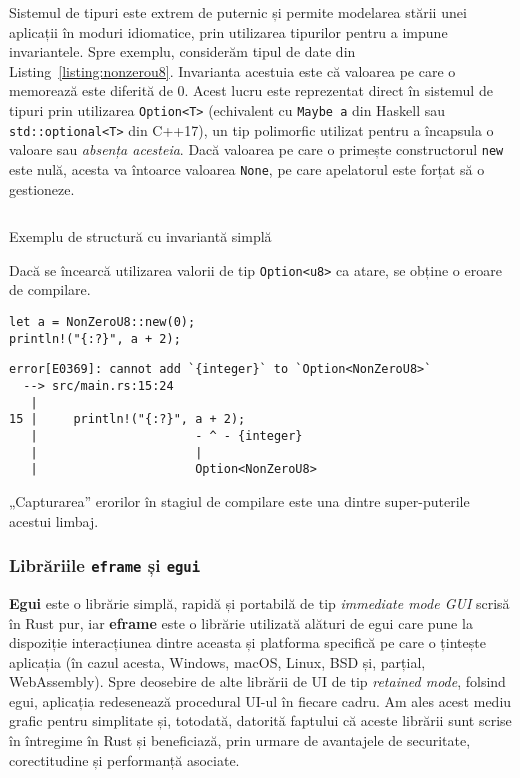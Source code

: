 \documentclass[a4paper]{article}
\begin{document}
Sistemul de tipuri este extrem de puternic și permite modelarea stării unei aplicații în moduri idiomatice, prin utilizarea tipurilor
pentru a impune invariantele. Spre exemplu, considerăm tipul de date din Listing~\ref{listing:nonzerou8}. Invarianta acestuia este
că valoarea pe care o memorează este diferită de $0$. Acest lucru este reprezentat direct în sistemul de tipuri prin utilizarea
\texttt{Option<T>} (echivalent cu \texttt{Maybe a} din Haskell sau \texttt{std::optional<T>} din C++17), un tip polimorfic utilizat
pentru a încapsula o valoare sau \textit{absența acesteia}. Dacă valoarea pe care o primește constructorul \texttt{new} este nulă,
acesta va întoarce valoarea \texttt{None}, pe care apelatorul este forțat să o gestioneze.

\begin{listing}
	\inputminted{rust}{codeblocks/nonzerou8.rs}
	\caption{Exemplu de structură cu invariantă simplă}
	\label{listing:nonzerou8}
\end{listing}

Dacă se încearcă utilizarea valorii de tip \texttt{Option<u8>} ca atare, se obține o eroare de compilare.

\begin{verbatim}
let a = NonZeroU8::new(0);
println!("{:?}", a + 2);
\end{verbatim}
\begin{verbatim}
error[E0369]: cannot add `{integer}` to `Option<NonZeroU8>`
  --> src/main.rs:15:24
   |
15 |     println!("{:?}", a + 2);
   |                      - ^ - {integer}
   |                      |
   |                      Option<NonZeroU8>
\end{verbatim}

„Capturarea” erorilor în stagiul de compilare este una dintre super-puterile acestui limbaj.

\subsubsection{Librăriile \texttt{eframe} și \texttt{egui}}
\textbf{Egui} este o librărie simplă, rapidă și portabilă de tip \textit{immediate mode GUI} scrisă în Rust pur\cite{egui}, iar
\textbf{eframe} este o librărie utilizată alături de egui care pune la dispoziție interacțiunea dintre aceasta și platforma specifică
pe care o țintește aplicația (în cazul acesta, Windows, macOS, Linux, BSD și, parțial, WebAssembly). Spre deosebire de alte librării
de UI de tip \textit{retained mode}, folsind egui, aplicația redesenează procedural UI-ul în fiecare cadru. Am ales acest mediu
grafic pentru simplitate și, totodată, datorită faptului că aceste librării sunt scrise în întregime în Rust și beneficiază, prin urmare
de avantajele de securitate, corectitudine și performanță asociate.
\end{document}
